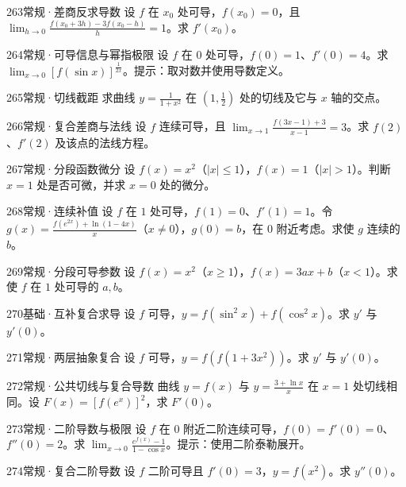 \begin{exercise}{263}{常规·差商反求导数}
设 $f$ 在 $x_0$ 处可导，$f(x_0)=0$，且 $\lim_{h\to0}\frac{f(x_0+3h)-3f(x_0-h)}{h}=1$。求 $f'(x_0)$。
\end{exercise}
\begin{exercise}{264}{常规·可导信息与幂指极限}
设 $f$ 在 $0$ 处可导，$f(0)=1$、$f'(0)=4$。求 $\lim_{x\to0}[f(\sin x)]^{\frac{1}{2x}}$。提示：取对数并使用导数定义。
\end{exercise}
\begin{exercise}{265}{常规·切线截距}
求曲线 $y=\frac{1}{1+x^2}$ 在 $(1,\frac{1}{2})$ 处的切线及它与 $x$ 轴的交点。
\end{exercise}
\begin{exercise}{266}{常规·复合差商与法线}
设 $f$ 连续可导，且 $\lim_{x\to1}\frac{f(3x-1)+3}{x-1}=3$。求 $f(2)$、$f'(2)$ 及该点的法线方程。
\end{exercise}
\begin{exercise}{267}{常规·分段函数微分}
设 $f(x)=x^2$（$|x|\le1$），$f(x)=1$（$|x|>1$）。判断 $x=1$ 处是否可微，并求 $x=0$ 处的微分。
\end{exercise}
\begin{exercise}{268}{常规·连续补值}
设 $f$ 在 $1$ 处可导，$f(1)=0$、$f'(1)=1$。令 $g(x)=\frac{f(e^{2x})+\ln(1-4x)}{x}$（$x\ne0$），$g(0)=b$，在 $0$ 附近考虑。求使 $g$ 连续的 $b$。
\end{exercise}
\begin{exercise}{269}{常规·分段可导参数}
设 $f(x)=x^2$（$x\ge1$），$f(x)=3ax+b$（$x<1$）。求使 $f$ 在 $1$ 处可导的 $a,b$。
\end{exercise}
\begin{exercise}{270}{基础·互补复合求导}
设 $f$ 可导，$y=f(\sin^2x)+f(\cos^2x)$。求 $y'$ 与 $y'(0)$。
\end{exercise}
\begin{exercise}{271}{常规·两层抽象复合}
设 $f$ 可导，$y=f(f(1+3x^2))$。求 $y'$ 与 $y'(0)$。
\end{exercise}
\begin{exercise}{272}{常规·公共切线与复合导数}
曲线 $y=f(x)$ 与 $y=\frac{3+\ln x}{x}$ 在 $x=1$ 处切线相同。设 $F(x)=[f(e^x)]^2$，求 $F'(0)$。
\end{exercise}
\begin{exercise}{273}{常规·二阶导数与极限}
设 $f$ 在 $0$ 附近二阶连续可导，$f(0)=f'(0)=0$、$f''(0)=2$。求 $\lim_{x\to0}\frac{e^{f(x)}-1}{1-\cos x}$。提示：使用二阶泰勒展开。
\end{exercise}
\begin{exercise}{274}{常规·复合二阶导数}
设 $f$ 二阶可导且 $f'(0)=3$，$y=f(x^2)$。求 $y''(0)$。
\end{exercise}
